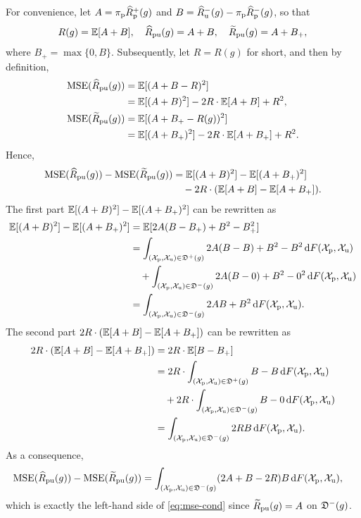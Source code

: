 For convenience, let $A=\pip\hRp^+(g)$ and $B=\hRu^-(g)-\pip\hRp^-(g)$, so that
\begin{align*}
R(g)=\bE[A+B],\quad
\hRpu(g)=A+B,\quad
\tRpu(g)=A+B_+,
\end{align*}
where $B_+=\max\{0,B\}$. Subsequently, let $R=R(g)$ for short, and then by definition,
\begin{align*}
\mse(\hRpu(g))
&= \bE[(A+B-R)^2]\\
&= \bE[(A+B)^2]-2R\cdot\bE[A+B]+R^2,\\
\mse(\tRpu(g))
&= \bE[(A+B_+-R(g))^2]\\
&= \bE[(A+B_+)^2]-2R\cdot\bE[A+B_+]+R^2.
\end{align*}
Hence,
\begin{align*}
\mse(\hRpu(g))-\mse(\tRpu(g))
&= \bE[(A+B)^2]-\bE[(A+B_+)^2]\\
&\quad -2R\cdot(\bE[A+B]-\bE[A+B_+]).
\end{align*}
The first part $\bE[(A+B)^2]-\bE[(A+B_+)^2]$ can be rewritten as
\begin{align*}
\bE[(A+B)^2]-\bE[(A+B_+)^2]
&= \bE[2A(B-B_+)+B^2-B_+^2]\\
&= \int_{(\Xp,\Xu)\in\fD^+(g)}2A(B-B)+B^2-B^2\,\dif F(\Xp,\Xu)\\
&\quad +\int_{(\Xp,\Xu)\in\fD^-(g)}2A(B-0)+B^2-0^2\,\dif F(\Xp,\Xu)\\
&= \int_{(\Xp,\Xu)\in\fD^-(g)}2AB+B^2\,\dif F(\Xp,\Xu).
\end{align*}
The second part $2R\cdot(\bE[A+B]-\bE[A+B_+])$ can be rewritten as
\begin{align*}
2R\cdot(\bE[A+B]-\bE[A+B_+])
&= 2R\cdot\bE[B-B_+]\\
&= 2R\cdot\int_{(\Xp,\Xu)\in\fD^+(g)}B-B\,\dif F(\Xp,\Xu)\\
&\quad +2R\cdot\int_{(\Xp,\Xu)\in\fD^-(g)}B-0\,\dif F(\Xp,\Xu)\\
&= \int_{(\Xp,\Xu)\in\fD^-(g)}2RB\,\dif F(\Xp,\Xu).
\end{align*}
As a consequence,
\begin{align*}
\mse(\hRpu(g))-\mse(\tRpu(g))
&= \int_{(\Xp,\Xu)\in\fD^-(g)}(2A+B-2R)B\,\dif F(\Xp,\Xu),
\end{align*}
which is exactly the left-hand side of \eqref{eq:mse-cond} since $\tRpu(g)=A$ on $\fD^-(g)$.

